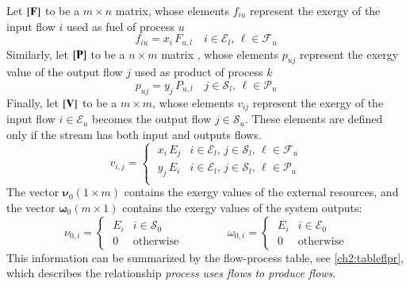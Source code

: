 \documentclass{ecos2018}
\begin{document}
Let  $\left[ \textbf{F} \right]$ to be a  $m \times n$ matrix, whose elements $f_{iu}$ represent the exergy  of the input flow $i$ used as fuel of process $u$
\[
f_{iu}=x_i\,F_{u,l} \quad i\in\mathcal{E}_l, \, \ell\in\mathcal{F}_u
\] 
Similarly, let $\left[ \textbf{P} \right]$ to be a $n \times m$ matrix , whose elements $p_{uj}$ represent the exergy value of the output flow $j$ used as product of process $k$
\[
p_{uj}=y_j\,P_{u,l} \quad j\in\mathcal{S}_l, \, \ell\in\mathcal{P}_u
\] 
Finally, let $\left[ \textbf{V} \right]$ to be a $m \times m$, whose elements $v_{ij}$ represent the exergy of the input flow $i\in\mathcal{E}_u$ becomes the output flow $j\in\mathcal{S}_u$. These elements are defined only if the stream has both input and outputs flows.
\begin{equation}
v_{i,j}=\begin{cases}
\;x_i\,E_j & i\in\mathcal{E}_l,\, j\in\mathcal{S}_l,\, \ell\in\mathcal{F}_u\\[1em]
\;y_j\,E_i & i\in\mathcal{E}_l,\, j\in\mathcal{S}_l,\, \ell\in\mathcal{P}_u\\
\end{cases}
\end{equation}
The vector $\bm{\nu}_0 (1 \times m)$ contains the exergy values of the external resources, and the vector $\bm{\omega}_0 (m \times 1)$ contains the exergy values of the system outputs:
\begin{equation}
\nu_{0,i}=\begin{cases}
\;E_i & i\in\mathcal{S}_0 \\
\;0   & \text{otherwise}
\end{cases}
\qquad\qquad
\omega_{0,i}=\begin{cases}
\;E_i & i\in\mathcal{E}_0 \\
\;0   & \text{otherwise}
\end{cases}
\end{equation}
This information can be summarized by the flow-process table, see \cref{ch2:tableflpr}, which describes the relationship \emph{process uses flows to produce flows}.
\end{document}
